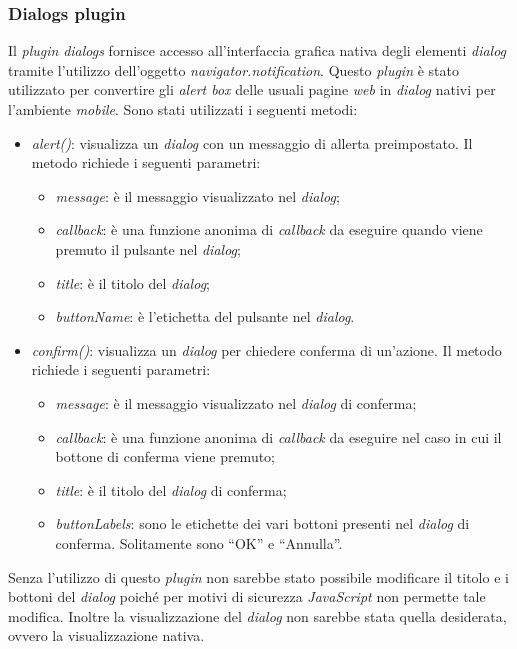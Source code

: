 \subsubsection{Dialogs plugin}

Il \textit{plugin} \textit{dialogs} fornisce accesso all'interfaccia grafica nativa degli elementi \textit{dialog} tramite l'utilizzo dell'oggetto \textit{navigator.notification}. Questo \textit{plugin} è stato utilizzato per convertire gli \textit{alert box} delle usuali pagine \textit{web} in \textit{dialog} nativi per l'ambiente \textit{mobile}. Sono stati utilizzati i seguenti metodi:
\begin{itemize}
	\item \textit{alert()}: visualizza un \textit{dialog} con un messaggio di allerta preimpostato. Il metodo richiede i seguenti parametri:
	\begin{itemize}
		\item \textit{message}: è il messaggio visualizzato nel \textit{dialog};
		\item \textit{callback}: è una funzione anonima di \textit{callback} da eseguire quando viene premuto il pulsante nel \textit{dialog};
		\item \textit{title}: è il titolo del \textit{dialog};
		\item \textit{buttonName}: è l'etichetta del pulsante nel \textit{dialog}.
	\end{itemize}
	\item \textit{confirm()}: visualizza un \textit{dialog} per chiedere conferma di un'azione. Il metodo richiede i seguenti parametri:
	\begin{itemize}
		\item \textit{message}: è il messaggio visualizzato nel \textit{dialog} di conferma;
		\item \textit{callback}: è una funzione anonima di \textit{callback} da eseguire nel caso in cui il bottone di conferma viene premuto;
		\item \textit{title}: è il titolo del \textit{dialog} di conferma;
		\item \textit{buttonLabels}: sono le etichette dei vari bottoni presenti nel \textit{dialog} di conferma. Solitamente sono ``OK'' e ``Annulla''.
	\end{itemize}
\end{itemize}

Senza l'utilizzo di questo \textit{plugin} non sarebbe stato possibile modificare il titolo e i bottoni del \textit{dialog} poiché per motivi di sicurezza \textit{JavaScript} non permette tale modifica. Inoltre la visualizzazione del \textit{dialog} non sarebbe stata quella desiderata, ovvero la visualizzazione nativa. 

